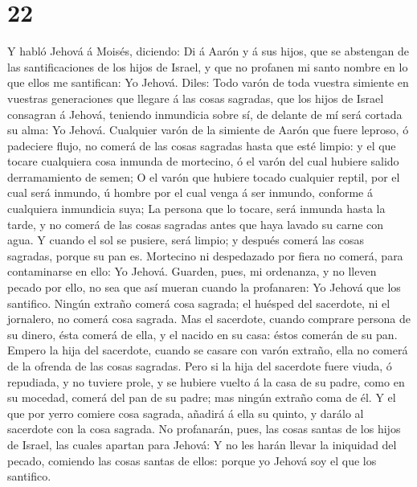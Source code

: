 \hypertarget{section-21}{%
\section{22}\label{section-21}}

 Y habló Jehová á Moisés, diciendo:  Di á
Aarón y á sus hijos, que se abstengan de las santificaciones de los
hijos de Israel, y que no profanen mi santo nombre en lo que ellos me
santifican: Yo Jehová.  Diles: Todo varón de toda vuestra
simiente en vuestras generaciones que llegare á las cosas sagradas, que
los hijos de Israel consagran á Jehová, teniendo inmundicia sobre sí, de
delante de mí será cortada su alma: Yo Jehová.  Cualquier
varón de la simiente de Aarón que fuere leproso, ó padeciere flujo, no
comerá de las cosas sagradas hasta que esté limpio: y el que tocare
cualquiera cosa inmunda de mortecino, ó el varón del cual hubiere salido
derramamiento de semen;  O el varón que hubiere tocado
cualquier reptil, por el cual será inmundo, ú hombre por el cual venga á
ser inmundo, conforme á cualquiera inmundicia suya;  La
persona que lo tocare, será inmunda hasta la tarde, y no comerá de las
cosas sagradas antes que haya lavado su carne con agua.  Y
cuando el sol se pusiere, será limpio; y después comerá las cosas
sagradas, porque su pan es.  Mortecino ni despedazado por
fiera no comerá, para contaminarse en ello: Yo Jehová. 
Guarden, pues, mi ordenanza, y no lleven pecado por ello, no sea que así
mueran cuando la profanaren: Yo Jehová que los santifico.
 Ningún extraño comerá cosa sagrada; el huésped del
sacerdote, ni el jornalero, no comerá cosa sagrada.  Mas
el sacerdote, cuando comprare persona de su dinero, ésta comerá de ella,
y el nacido en su casa: éstos comerán de su pan.  Empero
la hija del sacerdote, cuando se casare con varón extraño, ella no
comerá de la ofrenda de las cosas sagradas.  Pero si la
hija del sacerdote fuere viuda, ó repudiada, y no tuviere prole, y se
hubiere vuelto á la casa de su padre, como en su mocedad, comerá del pan
de su padre; mas ningún extraño coma de él.  Y el que por
yerro comiere cosa sagrada, añadirá á ella su quinto, y darálo al
sacerdote con la cosa sagrada.  No profanarán, pues, las
cosas santas de los hijos de Israel, las cuales apartan para Jehová:
 Y no les harán llevar la iniquidad del pecado, comiendo
las cosas santas de ellos: porque yo Jehová soy el que los santifico.
